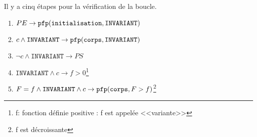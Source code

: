 Il y a cinq étapes pour la vérification de la boucle.
\begin{enumerate}
	\item $PE \rightarrow \pfp(\texttt{initialisation}, \texttt{INVARIANT})$
	\item $c \wedge \texttt{INVARIANT} \rightarrow \pfp (\texttt{corps}, \texttt{INVARIANT})$\label{etape2boucle}
	\item $\neg c \wedge \texttt{INVARIANT} \rightarrow PS$ \label{etape3boucle}
	\item $ \texttt{INVARIANT} \wedge c \rightarrow f > 0$\footnote{f: fonction définie positive : f est appelée <<variante>>}
	\item $F = f \wedge \texttt{INVARIANT} \wedge c \rightarrow \pfp (\texttt{corps}, F > f)$\footnote{f est décroissante}
\end{enumerate}

